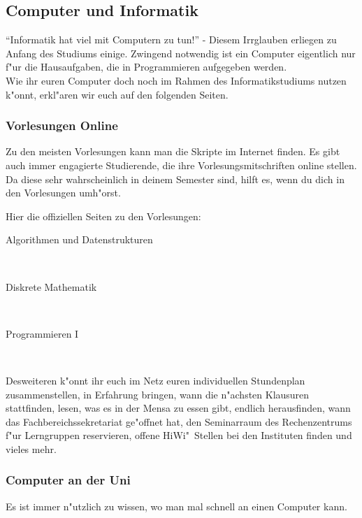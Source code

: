 \subsection{Computer und Informatik}
"`Informatik hat viel mit Computern zu tun!"' - Diesem Irrglauben erliegen zu
Anfang des Studiums einige. Zwingend notwendig ist ein Computer eigentlich nur
f"ur die Hausaufgaben, die in Programmieren aufgegeben werden.\\
Wie ihr euren Computer doch noch im Rahmen des Informatikstudiums nutzen
k"onnt, erkl"aren wir euch auf den folgenden Seiten.

\subsubsection{Vorlesungen Online}
Zu den meisten Vorlesungen kann man die Skripte im Internet finden. Es gibt auch
immer engagierte Studierende, die ihre Vorlesungsmitschriften online stellen.
Da diese sehr wahrscheinlich in deinem Semester sind, hilft es, wenn du dich
in den Vorlesungen umh"orst.\par
Hier die offiziellen Seiten zu den Vorlesungen:

\begin{description}
\item[Algorithmen und Datenstrukturen]~\\
{\footnotesize{}}
\item[Diskrete Mathematik]~\\
{\footnotesize{}}
\item[Programmieren I]~\\
{\footnotesize{}}
\end{description}

Desweiteren k"onnt ihr euch im Netz euren individuellen Stundenplan
zusammenstellen, in Erfahrung bringen, wann die n"achsten Klausuren
stattfinden, lesen, was es in der Mensa zu essen gibt, endlich herausfinden,
wann das Fachbereichssekretariat ge"offnet hat, den Seminarraum des
Rechenzentrums f"ur Lerngruppen reservieren, offene HiWi"~Stellen bei den
Instituten finden und vieles mehr.

\subsubsection{Computer an der Uni}
Es ist immer n"utzlich zu wissen, wo man mal schnell an einen Computer kann.

